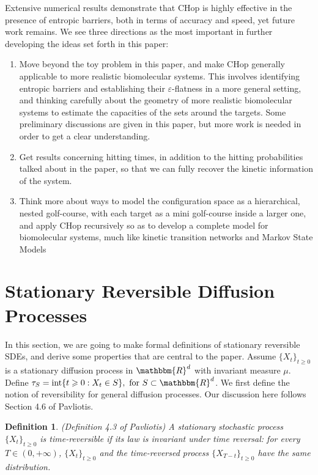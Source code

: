 \documentclass[english, aip, jcp, priprint, graphicx]{revtex4-1}
\newtheorem{definition}{Definition}
\theoremstyle{plain}
\theoremstyle{definition}
\theoremstyle{plain}
\begin{document}
Extensive numerical results demonstrate that CHop is highly effective in the presence of entropic barriers, both in terms of accuracy and speed, yet future work remains. We see three directions as the most important in further developing the ideas set forth in this paper:
\begin{enumerate}
	\item Move beyond the toy problem in this paper, and make CHop generally applicable to more realistic biomolecular systems. This involves identifying entropic barriers and establishing their $\varepsilon$-flatness in a more general setting, and thinking carefully about the geometry of more realistic biomolecular systems to estimate the capacities of the sets around the targets. Some preliminary discussions are given in this paper, but more work is needed in order to get a clear understanding.
	\item Get results concerning hitting times, in addition to the hitting probabilities talked about in the paper, so that we can fully recover the kinetic information of the system.
	\item Think more about ways to model the configuration space as a hierarchical, nested golf-course, with each target as a mini golf-course inside a larger one, and apply CHop recursively so as to develop a complete model for biomolecular systems, much like kinetic transition networks\cite{Noe2006-cs, Wales2006-ur} and Markov State Models \cite{Pande2010-yi, Chodera2014-bh, Husic2018-xp}
\end{enumerate}

\appendix

\section{Stationary Reversible Diffusion Processes}\label{sec:reversible_diffusion}

In this section, we are going to make formal definitions of stationary
reversible SDEs, and derive some properties that are central to the paper.
Assume $\{X_t\}_{t \geqslant 0}$ is a stationary diffusion process in
$\mathbbm{R}^d$ with invariant measure ${\mu}$. Define $\tau_S
=\ensuremath{\operatorname{int}} \{ t \geqslant 0 : X_t \in S \} , \text{ for
} S \subset \mathbbm{R}^d$. We first define the notion of reversibility for
general diffusion processes. Our discussion here follows Section 4.6 of
Pavliotis\cite{Pavliotis2016-xn}.

\begin{definition}
(Definition 4.3 of Pavliotis\cite{Pavliotis2016-xn}) A stationary stochastic
process $\{X_t\}_{t \geqslant 0}$ is time-reversible if its law is invariant under time
reversal: for every $T \in (0, + \infty)$, $\{X_t\}_{t \geqslant 0}$ and the time-reversed
process $\{X_{T - t}\}_{t \geqslant 0}$ have the same distribution.
\end{definition}
\end{document}
